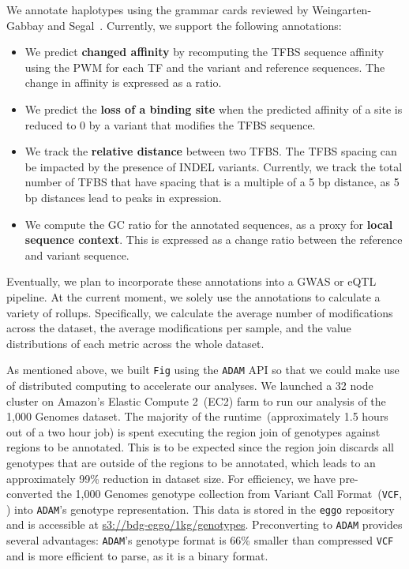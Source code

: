 \documentclass[11pt]{article}
\theoremstyle{plain}
\begin{document}
We annotate haplotypes using the grammar cards reviewed by Weingarten-Gabbay and
Segal~\cite{weingarten14}. Currently, we support the following annotations:

\begin{itemize}
\item We predict \textbf{changed affinity} by recomputing the TFBS sequence affinity
using the PWM for each TF and the variant and reference sequences. The change in
affinity is expressed as a ratio.
\item We predict the \textbf{loss of a binding site} when the predicted affinity of a
site is reduced to 0 by a variant that modifies the TFBS sequence.
\item We track the \textbf{relative distance} between two TFBS. The TFBS spacing can
be impacted by the presence of INDEL variants. Currently, we track the total number of
TFBS that have spacing that is a multiple of a 5 bp distance, as 5 bp distances lead
to peaks in expression.
\item We compute the GC ratio for the annotated sequences, as a proxy for \textbf{local
sequence context}. This is expressed as a change ratio between the reference and variant
sequence.
\end{itemize}

Eventually, we plan to incorporate these annotations into a GWAS or eQTL pipeline. At
the current moment, we solely use the annotations to calculate a variety of rollups.
Specifically, we calculate the average number of modifications across the dataset,
the average modifications per sample, and the value distributions of each metric
across the whole dataset.

As mentioned above, we built \texttt{Fig} using the \texttt{ADAM} API so that we could
make use of distributed computing to accelerate our analyses. We launched a 32 node
cluster on Amazon's Elastic Compute 2~(EC2) farm to run our analysis of the 1,000 Genomes
dataset. The majority of the runtime~(approximately 1.5 hours out of a two hour job) is
spent executing the region join of genotypes against regions to be annotated. This is
to be expected since the region join discards all genotypes that are outside of the
regions to be annotated, which leads to an approximately 99\% reduction in dataset size.
For efficiency, we have pre-converted the 1,000 Genomes genotype collection from Variant
Call Format~(\texttt{VCF}, \cite{danecek11}) into \texttt{ADAM}'s genotype representation.
This data is stored in the \texttt{eggo} repository~\cite{eggo} and is accessible at
\url{s3://bdg-eggo/1kg/genotypes}. Preconverting to \texttt{ADAM} provides several
advantages: \texttt{ADAM}'s genotype format is 66\% smaller than compressed \texttt{VCF}
and is more efficient to parse, as it is a binary format.
\end{document}
